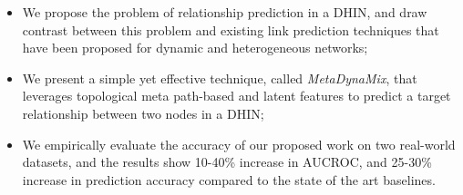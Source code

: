 \begin{itemize}

\item We propose the problem of relationship prediction in a DHIN, and draw contrast between this problem and existing link prediction techniques that have been proposed for dynamic and heterogeneous networks;

\item We present a simple yet effective technique, called \textit{MetaDynaMix}, that leverages topological meta path-based and latent features to predict a target relationship between two nodes in a DHIN;



\item We empirically evaluate the accuracy of our proposed work on two real-world datasets, and the results show 10-40\% increase in AUCROC, and 25-30\% increase in prediction accuracy compared to the state of the art baselines.

\end{itemize}


